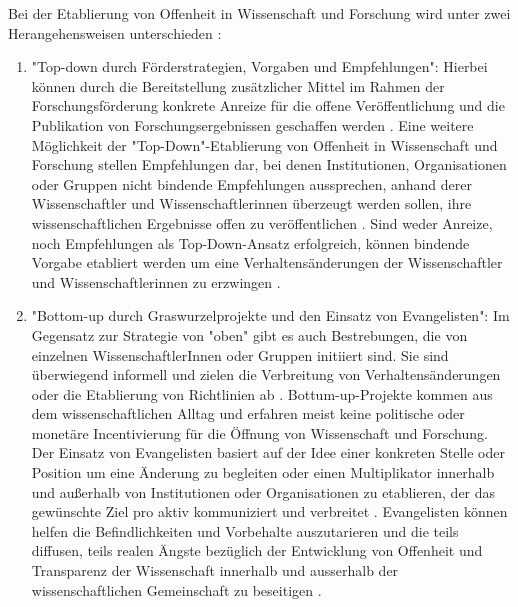 Bei der Etablierung von Offenheit in Wissenschaft und Forschung wird unter zwei Herangehensweisen unterschieden \cite{schulze_2013_open}:
\begin{enumerate}
\item "Top-down durch Förderstrategien, Vorgaben und Empfehlungen": Hierbei können durch die Bereitstellung zusätzlicher Mittel im Rahmen der Forschungsförderung konkrete Anreize für die offene Veröffentlichung und die Publikation von Forschungsergebnissen geschaffen werden \cite{suchen}. Eine weitere Möglichkeit der "Top-Down"-Etablierung von Offenheit in Wissenschaft und Forschung stellen Empfehlungen dar, bei denen Institutionen, Organisationen oder Gruppen nicht bindende Empfehlungen aussprechen, anhand derer Wissenschaftler und Wissenschaftlerinnen überzeugt werden sollen, ihre wissenschaftlichen Ergebnisse offen zu veröffentlichen \cite{suchen}. Sind weder Anreize, noch Empfehlungen als Top-Down-Ansatz erfolgreich, können bindende Vorgabe etabliert werden um eine Verhaltensänderungen der Wissenschaftler und Wissenschaftlerinnen zu erzwingen \cite{suchen}.
\item "Bottom-up durch Graswurzelprojekte und den Einsatz von Evangelisten":
Im Gegensatz zur Strategie von "oben" gibt es auch Bestrebungen, die von einzelnen WissenschaftlerInnen oder Gruppen initiiert sind. Sie sind überwiegend informell und zielen die Verbreitung von Verhaltensänderungen oder die Etablierung von Richtlinien ab \cite{suchen}. Bottum-up-Projekte kommen aus dem wissenschaftlichen Alltag und erfahren meist keine politische oder monetäre Incentivierung für die Öffnung von Wissenschaft und Forschung. Der Einsatz von Evangelisten basiert auf der Idee einer konkreten Stelle oder Position um eine Änderung zu begleiten \cite{suchen} oder einen Multiplikator innerhalb und außerhalb von Institutionen oder Organisationen zu etablieren, der das gewünschte Ziel pro aktiv kommuniziert und verbreitet \cite{suchen}. Evangelisten können helfen die Befindlichkeiten und Vorbehalte auszutarieren und die teils diffusen, teils realen Ängste bezüglich der Entwicklung von Offenheit und Transparenz der Wissenschaft innerhalb und ausserhalb der wissenschaftlichen Gemeinschaft zu beseitigen \cite{schulze_2013_open}.
\end{enumerate}

